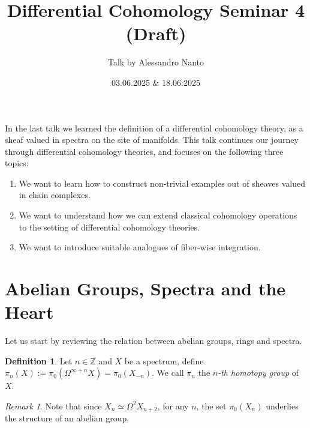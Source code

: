 \documentclass[10pt]{amsart}
\title{Differential Cohomology Seminar 4 (Draft)}
\date{03.06.2025 $\&$ 18.06.2025}
\author{Talk by Alessandro Nanto}
\newcommand{\bZ}{\mathbb{Z}}
\theoremstyle{definition}
\newtheorem{definition}[equation]{Definition}
\theoremstyle{remark}
\newtheorem{remark}[equation]{Remark}
\numberwithin{equation}{section}
\begin{document}
\maketitle

In the last talk we learned the definition of a differential cohomology theory, as a sheaf valued in spectra on the site of manifolds. This talk continues our journey through differential cohomology theories, and focuses on the following three topics:
\begin{enumerate}
  \item We want to learn how to construct non-trivial examples out of sheaves valued in chain complexes.
  \item We want to understand how we can extend classical cohomology operations to the setting of differential cohomology theories.
  \item We want to introduce suitable analogues of fiber-wise integration.  
\end{enumerate}

\section{Abelian Groups, Spectra and the Heart}
Let us start by reviewing the relation between abelian groups, rings and spectra. 
\begin{definition}
    Let $n\in\bZ$ and $X$ be a spectrum, define $\pi_n(X):=\pi_0(\Omega^{\infty+n}X)=\pi_0(X_{-n})$. We call $\pi_n$ the \textit{$n$-th homotopy group} of $X$. 
\end{definition}
\begin{remark}
 Note that since $X_n\simeq\Omega^2X_{n+2}$, for any $n$, the set $\pi_0(X_n)$ underlies the structure of an abelian group.
\end{remark}
\end{document}

